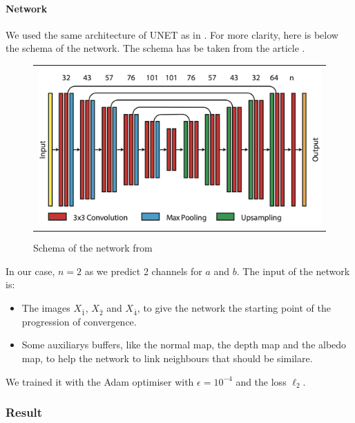 \documentclass{classeENS}
\begin{document}
\paragraph*{Network} We used the same architecture of UNET as in \cite{kuznetsov2018deep}. For more clarity, 
here is below the schema of the network. The schema has be taken from the article 
\cite{kuznetsov2018deep}.
\begin{figure}[H]
    \centering
    \caption{Schema of the network from \cite{kuznetsov2018deep}}
    \begin{tabular}{c}
    \includegraphics[width=120mm]{image/network.png}
    \end{tabular}
\end{figure}
In our case, $n=2$ as we predict 2 channels for $a$ and $b$. The input of the network
is:
\begin{itemize}
    \item The images $X_{\bar 1}$, $X_{\bar 2}$ and $X_{\bar 4}$, to give the network the starting point 
    of the progression of convergence.
    \item Some auxiliarys buffers, like the normal map, the depth map and the albedo map, to help the 
    network to link neighbours that should be similare.
\end{itemize}

We trained it with the Adam optimiser \cite{kingma2017adam} 
with $\epsilon=10^{-4}$ and the loss $\ell_2$.

\subsubsection{Result}
\end{document}

